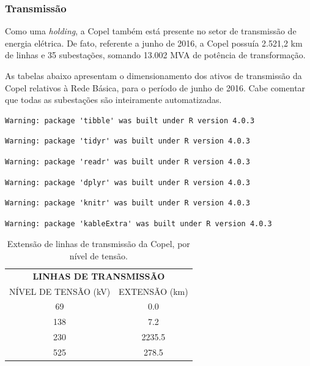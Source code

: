 \documentclass[grad,numbers]{coppe}
\begin{document}
  \hypertarget{transmissuxe3o}{%
  \subsubsection{Transmissão}\label{transmissuxe3o}}

  Como uma \emph{holding}, a Copel também está presente no setor de transmissão de energia elétrica. De fato, referente a junho de 2016, a Copel possuía 2.521,2 km de linhas e 35 subestações, somando 13.002 MVA de potência de transformação.

  As tabelas abaixo apresentam o dimensionamento dos ativos de transmissão da Copel relativos à Rede Básica, para o período de junho de 2016. Cabe comentar que todas as subestações são inteiramente automatizadas.
\begin{verbatim}
Warning: package 'tibble' was built under R version 4.0.3
\end{verbatim}
\begin{verbatim}
Warning: package 'tidyr' was built under R version 4.0.3
\end{verbatim}
\begin{verbatim}
Warning: package 'readr' was built under R version 4.0.3
\end{verbatim}
\begin{verbatim}
Warning: package 'dplyr' was built under R version 4.0.3
\end{verbatim}
\begin{verbatim}
Warning: package 'knitr' was built under R version 4.0.3
\end{verbatim}
\begin{verbatim}
Warning: package 'kableExtra' was built under R version 4.0.3
\end{verbatim}
  \begin{table}[H]

  \caption{\label{tab:unnamed-chunk-2}Extensão de linhas de transmissão da Copel, por nível de tensão.}
  \centering
  \begin{tabular}[t]{cc}
  \toprule
  \multicolumn{2}{c}{\textbf{LINHAS DE TRANSMISSÃO}} \\
  \cmidrule(l{3pt}r{3pt}){1-2}
  NÍVEL DE TENSÃO (kV) & EXTENSÃO (km)\\
  \midrule
  69 & 0.0\\
  138 & 7.2\\
  230 & 2235.5\\
  525 & 278.5\\
  \bottomrule
  \end{tabular}
  \end{table}
\end{document}
